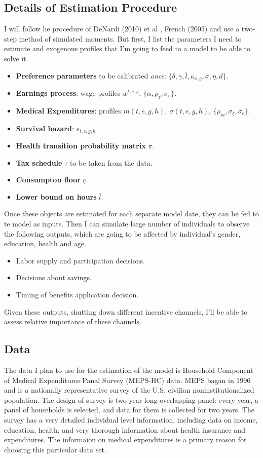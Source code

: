 \documentclass[
10pt, %
a4paper, %
oneside, %
headinclude,footinclude, %
BCOR5mm, %
]{scrartcl}
\begin{document}
\subsection{Details of Estimation Procedure}
I will follow he procedure of DeNardi (2010) et al \cite{DeNardi2010}, French (2005) \cite{French2005} and use a two-step method of simulated moments. But first, I list the parameters I need to estimate and exogenous profiles that I'm going to feed to a model to be able to solve it.
\begin{itemize}
\item \textbf{Preference parameters} to be calibrated \emph{once}: $\{\delta,\gamma,\bar{l},\kappa_{e,g},\sigma,\eta,d\}$.
\item \textbf{Earnings process}: wage profiles $w^{t,e,g}$, $\{\alpha,\rho_z,\sigma_{\varepsilon}\}$.
\item \textbf{Medical Expenditures}:  profiles $m(t,e,g,h),\ \sigma(t,e,g,h)$, $\{\rho_m,\sigma_{\xi},\sigma_{\epsilon}\}$.
\item \textbf{Survival hazard}: $s_{t,e,g,h}$.
\item \textbf{Health transition probability matrix} $\pi$.
\item \textbf{Tax schedule} $\tau$ to be taken from the data.
\item \textbf{Consumpton floor} $\underline{c}$.
\item \textbf{Lower bound on hours} $\bar{l}$.
\end{itemize}
Once these objects are estimated for each separate model date, they can be fed to te model  as inputs. Then I can simulate large number of individuals to observe the following outputs, which are going to be affected by individual's gender, education, health and age.
\begin{itemize}
\item Labor supply and participation decisions.
\item Decisions about savings.
\item Timing of benefits application decision.
\end{itemize}
Given these outputs, shutting down different incentive channels, I'll be able to assess relative importance of these channels.

\subsection{Data}
The data I plan to use for the estimation of the model is Household Component of Medical Expenditures Panal Survey (MEPS-HC) data. MEPS bagan in 1996 and is a nationally representative survey of the U.S. civilian noninstitutionalized population. The design of survey is two-year-long overlapping panel: every year, a panel of households is selected, and data for them is collected for two years. The survey has a very detailed individual level information, including data on income, education, health, and very thorough information about health insurance and expenditures. The informaion on medical expenditures is a primary reason for choosing this particular data set. 
\end{document}
